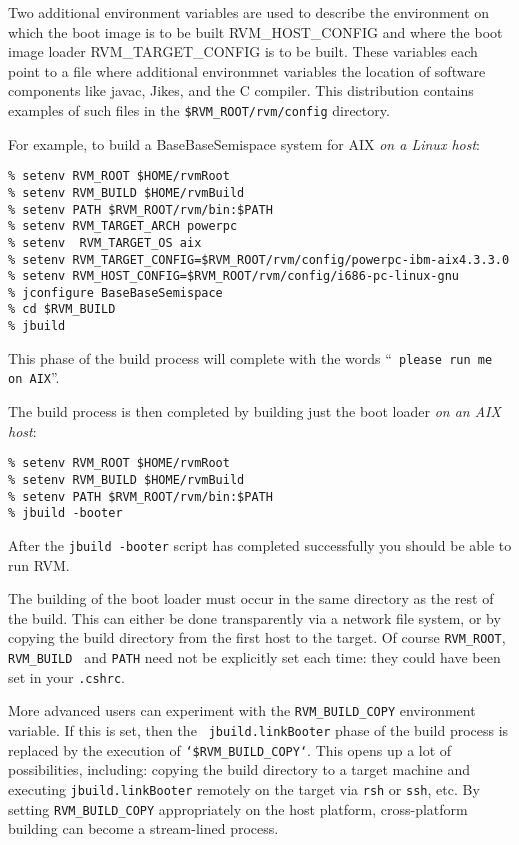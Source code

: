     Two additional environment variables are used to describe the 
environment on which the boot image is to be built RVM\_HOST\_CONFIG  and where
the boot image loader  RVM\_TARGET\_CONFIG is to be built. These variables
each point to a file where additional environmnet variables the location
of software components like javac, Jikes\trademark, and the C compiler. 
This distribution
contains examples of such files in the {\tt \$RVM\_ROOT/rvm/config} directory.   

For example, to build a BaseBaseSemispace system for AIX {\em on a Linux
host}:
\begin{verbatim}
% setenv RVM_ROOT $HOME/rvmRoot
% setenv RVM_BUILD $HOME/rvmBuild
% setenv PATH $RVM_ROOT/rvm/bin:$PATH
% setenv RVM_TARGET_ARCH powerpc
% setenv  RVM_TARGET_OS aix
% setenv RVM_TARGET_CONFIG=$RVM_ROOT/rvm/config/powerpc-ibm-aix4.3.3.0
% setenv RVM_HOST_CONFIG=$RVM_ROOT/rvm/config/i686-pc-linux-gnu
% jconfigure BaseBaseSemispace
% cd $RVM_BUILD
% jbuild
\end{verbatim}

This phase of the build process will complete with the words ``{\tt
  please run me on AIX}''.


The build process is then completed by building just the boot loader {\em
  on an AIX host}:

\begin{verbatim}
% setenv RVM_ROOT $HOME/rvmRoot
% setenv RVM_BUILD $HOME/rvmBuild
% setenv PATH $RVM_ROOT/rvm/bin:$PATH
% jbuild -booter
\end{verbatim}

After the {\tt jbuild -booter} script has completed successfully you should be able 
to run RVM. 

The building of the boot loader must occur in the same directory as
the rest of the build.  This can either be done transparently via a
network file system, or by copying the build directory from the first
host to the target.  Of course {\tt RVM\_ROOT}, {\tt RVM\_BUILD }
and {\tt PATH} need not be explicitly set each time: they could have
been set in your {\tt .cshrc}.

More advanced users can experiment with the {\tt RVM\_BUILD\_COPY}
environment variable.  If this is set, then the {\tt
  jbuild.linkBooter} phase of the build process is replaced by the
execution of {\tt `\$RVM\_BUILD\_COPY`}.  This opens up a lot of
possibilities, including: copying the build directory to a target
machine and executing {\tt jbuild.linkBooter} remotely on the target
via {\tt rsh} or {\tt ssh}, etc.  By setting {\tt RVM\_BUILD\_COPY}
appropriately on the host platform, cross-platform building can become
a stream-lined process.

